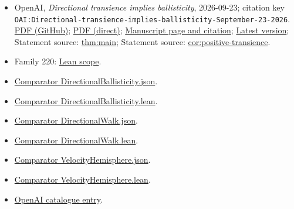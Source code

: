 \documentclass[11pt]{article}
\begin{document}
\begin{itemize}
\item OpenAI, \emph{Directional transience implies ballisticity}, 2026-09-23; citation key \texttt{OAI:Directional-transience-implies-ballisticity-September-23-2026}. \href{https://github.com/openai/math/blob/adc7f1241b42e322a6451854ab7e4b4c146bf78a/preprints/Directional-transience-implies-ballisticity-September-23-2026/paper.pdf}{PDF (GitHub)}; \href{https://github.com/openai/math/raw/adc7f1241b42e322a6451854ab7e4b4c146bf78a/preprints/Directional-transience-implies-ballisticity-September-23-2026/paper.pdf}{PDF (direct)}; \href{https://github.com/openai/math/blob/adc7f1241b42e322a6451854ab7e4b4c146bf78a/preprints/Directional-transience-implies-ballisticity-September-23-2026/README.md}{Manuscript page and citation}; \href{https://github.com/openai/math/blob/main/preprints/Directional-transience-implies-ballisticity-September-23-2026/paper.pdf}{Latest version}; Statement source: \href{https://github.com/openai/math/blob/adc7f1241b42e322a6451854ab7e4b4c146bf78a/preprints/Directional-transience-implies-ballisticity-September-23-2026/build/01-introduction.tex\#L50}{thm:main}; Statement source: \href{https://github.com/openai/math/blob/adc7f1241b42e322a6451854ab7e4b4c146bf78a/preprints/Directional-transience-implies-ballisticity-September-23-2026/build/01-introduction.tex\#L205}{cor:positive-transience}.
\item Family 220: \href{https://github.com/openai/math/blob/adc7f1241b42e322a6451854ab7e4b4c146bf78a/lean/docs/220.md}{Lean scope}.
\item \href{https://github.com/openai/math/blob/adc7f1241b42e322a6451854ab7e4b4c146bf78a/lean/ComparatorChallenges/DirectionalBallisticity.json}{Comparator DirectionalBallisticity.json}.
\item \href{https://github.com/openai/math/blob/adc7f1241b42e322a6451854ab7e4b4c146bf78a/lean/ComparatorChallenges/DirectionalBallisticity.lean}{Comparator DirectionalBallisticity.lean}.
\item \href{https://github.com/openai/math/blob/adc7f1241b42e322a6451854ab7e4b4c146bf78a/lean/ComparatorChallenges/DirectionalWalk.json}{Comparator DirectionalWalk.json}.
\item \href{https://github.com/openai/math/blob/adc7f1241b42e322a6451854ab7e4b4c146bf78a/lean/ComparatorChallenges/DirectionalWalk.lean}{Comparator DirectionalWalk.lean}.
\item \href{https://github.com/openai/math/blob/adc7f1241b42e322a6451854ab7e4b4c146bf78a/lean/ComparatorChallenges/VelocityHemisphere.json}{Comparator VelocityHemisphere.json}.
\item \href{https://github.com/openai/math/blob/adc7f1241b42e322a6451854ab7e4b4c146bf78a/lean/ComparatorChallenges/VelocityHemisphere.lean}{Comparator VelocityHemisphere.lean}.
\item \href{https://github.com/openai/math/blob/adc7f1241b42e322a6451854ab7e4b4c146bf78a/CONTENTS.md}{OpenAI catalogue entry}.
\end{itemize}
\end{document}
